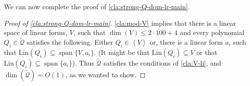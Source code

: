\documentclass[10pt,a4paper]{article}
\newcommand{\cQ}{{\mathcal{Q}}}
\newcommand{\ideal}[1]{\left \langle{#1}\right \rangle}
\newcommand{\spn}[1]{\operatorname{span}\{{#1}\}}
\newcommand{\rkq}{100}
\newcommand{\MS}{\text{Lin}}
\begin{document}
We can now complete the proof of  \autoref{cla:strong-Q-dom-lr-main}.
\begin{proof}[Proof of \autoref{cla:strong-Q-dom-lr-main}]
		\autoref{cla:mod-V} implies that there is a linear space of linear forms, $V$, such that $\dim(V) \leq 2\cdot\rkq+ 4$ and  every polynomial $Q_i \in \tilde{\cQ}$ satisfies the following. Either $Q_i \in \ideal{V}$ or, there is a linear form $a_i$ such that $\MS(Q_i) \subseteq \spn{V,a_i}$. (It might be that $\MS(Q_i) \subseteq V$ or that $\MS(Q_i) \subseteq \spn{a_i}$). Thus $\tilde{\cQ}$ satisfies the conditions of \autoref{cla:V-li}, and $\dim(\tilde{\cQ}) = O(1)$, as we wanted to show.

\end{proof}
\end{document}

